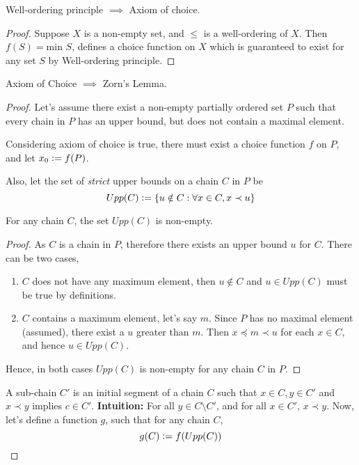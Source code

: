 \documentclass[11pt,a4paper]{article}
\begin{document}
\begin{theorem}
    Well-ordering principle $\implies$ Axiom of choice.
\end{theorem}

\begin{proof}
    Suppose $X$ is a non-empty set, and $\le$ is a well-ordering of $X$. Then $f(S) = \text{min }S$, defines a choice function on $X$ which is guaranteed to exist for any set $S$ by Well-ordering principle.
\end{proof}

\begin{theorem}
    Axiom of Choice $\implies$ Zorn's Lemma.
\end{theorem}

\begin{proof}
    Let's assume there exist a non-empty partially ordered set $P$ such that every chain in $P$ has an upper bound, but does not contain a maximal element. 
    
    Considering axiom of choice is true, there must exist a choice function $f$ on $P$, and let $x_0 \vcentcolon= f(P)$.
    
    Also, let the set of \emph{strict} upper bounds on a chain $C$ in $P$ be 
    $$
        Upp(C) \vcentcolon= \{ u \notin C : \forall x \in C, x \prec u \}
    $$
    
    \begin{lemma}
    For any chain $C$, the set $Upp(C)$ is non-empty.
    \end{lemma}
    
    \begin{proof}
        As $C$ is a chain in $P$, therefore there exists an upper bound $u$ for $C$. There can be two cases,
        \begin{enumerate}
            \item $C$ does not have any maximum element, then $u \notin C$ and $u \in Upp(C)$ must be true by definitions. 
            \item $C$ contains a maximum element, let's say $m$. Since $P$ has no maximal element (assumed), there exist a $u$ greater than $m$. Then $x \preccurlyeq m \prec u$ for each $x \in C$, and hence $u \in Upp(C)$.
        \end{enumerate}
        Hence, in both cases $Upp(C)$ is non-empty for any chain $C$ in $P$.
    \end{proof}

    A sub-chain $C'$ is an initial segment of a chain $C$ such that $x \in C, y \in C'$ and $x \prec y$ implies $c \in C'$. \textbf{Intuition:} For all $y \in C \setminus C'$, and for all $x \in C'$, $x \prec y$. Now, let's define a function $g$, such that for any chain $C$,
    $$
        g(C) \vcentcolon= f(Upp(C))
    $$


\end{proof}
\end{document}
